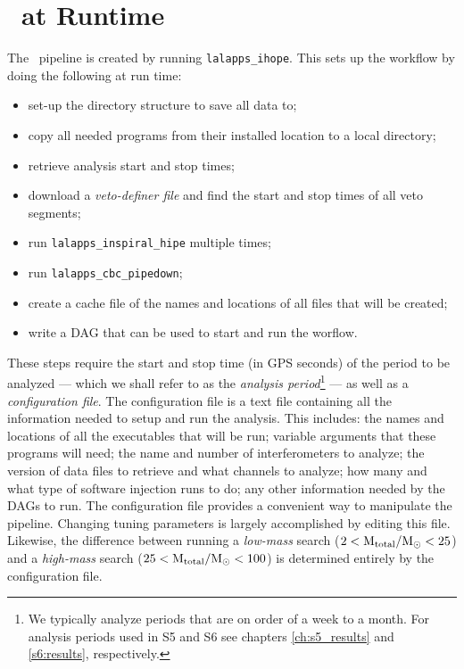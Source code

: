 \section{\ihope~at Runtime}
\label{sec:ihopeRuntime}

The \ihope~pipeline is created by running \texttt{lalapps\_ihope}. This sets up
the workflow by doing the following at run time:

\begin{itemize}
\item{set-up the directory structure to save all data to;}
\item{copy all needed programs from their installed location to a local directory;}
\item{retrieve analysis start and stop times;}
\item{download a {\it veto-definer file} and find the start and stop times of all veto segments;}
\item{run \texttt{lalapps\_inspiral\_hipe} multiple times;}
\item{run \texttt{lalapps\_cbc\_pipedown};}
\item{create a cache file of the names and locations of all files that will be created;}
\item{write a DAG that can be used to start and run the worflow.}
\end{itemize}

These steps require the start and stop time (in GPS seconds) of the period to
be analyzed --- which we shall refer to as the \emph{analysis
period}\footnote{We typically analyze periods that are on order of a week to a
month. For analysis periods used in \ac{S5} and \ac{S6} see chapters
\ref{ch:s5_results} and \ref{s6:results}, respectively.} --- as well as a
\emph{configuration file}. The configuration file is a text file containing all
the information needed to setup and run the analysis. This includes: the names
and locations of all the executables that will be run; variable arguments that
these programs will need; the name and number of interferometers to analyze;
the version of data files to retrieve and what channels to analyze; how many
and what type of software injection runs to do; any other information needed by
the \ac{DAG}s to run. The configuration file provides a convenient way to
manipulate the pipeline. Changing tuning parameters is largely accomplished by
editing this file. Likewise, the difference between running a {\it low-mass}
search ($2 < \mathrm{M_{total}}/\mathrm{M_\odot} < 25$) and a {\it high-mass} search ($25 <
\mathrm{M_{total}}/\mathrm{M_\odot} < 100$) is determined entirely by the configuration file.

